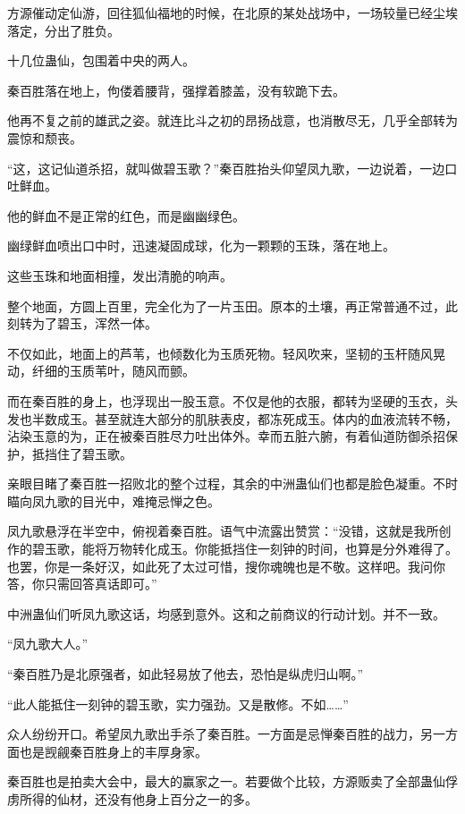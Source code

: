 
\begin{this_body}

方源催动定仙游，回往狐仙福地的时候，在北原的某处战场中，一场较量已经尘埃落定，分出了胜负。

十几位蛊仙，包围着中央的两人。

秦百胜落在地上，佝偻着腰背，强撑着膝盖，没有软跪下去。

他再不复之前的雄武之姿。就连比斗之初的昂扬战意，也消散尽无，几乎全部转为震惊和颓丧。

“这，这记仙道杀招，就叫做碧玉歌？”秦百胜抬头仰望凤九歌，一边说着，一边口吐鲜血。

他的鲜血不是正常的红色，而是幽幽绿色。

幽绿鲜血喷出口中时，迅速凝固成球，化为一颗颗的玉珠，落在地上。

这些玉珠和地面相撞，发出清脆的响声。

整个地面，方圆上百里，完全化为了一片玉田。原本的土壤，再正常普通不过，此刻转为了碧玉，浑然一体。

不仅如此，地面上的芦苇，也倾数化为玉质死物。轻风吹来，坚韧的玉杆随风晃动，纤细的玉质苇叶，随风而颤。

而在秦百胜的身上，也浮现出一股玉意。不仅是他的衣服，都转为坚硬的玉衣，头发也半数成玉。甚至就连大部分的肌肤表皮，都冻死成玉。体内的血液流转不畅，沾染玉意的为，正在被秦百胜尽力吐出体外。幸而五脏六腑，有着仙道防御杀招保护，抵挡住了碧玉歌。

亲眼目睹了秦百胜一招败北的整个过程，其余的中洲蛊仙们也都是脸色凝重。不时瞄向凤九歌的目光中，难掩忌惮之色。

凤九歌悬浮在半空中，俯视着秦百胜。语气中流露出赞赏：“没错，这就是我所创作的碧玉歌，能将万物转化成玉。你能抵挡住一刻钟的时间，也算是分外难得了。也罢，你是一条好汉，如此死了太过可惜，搜你魂魄也是不敬。这样吧。我问你答，你只需回答真话即可。”

中洲蛊仙们听凤九歌这话，均感到意外。这和之前商议的行动计划。并不一致。

“凤九歌大人。”

“秦百胜乃是北原强者，如此轻易放了他去，恐怕是纵虎归山啊。”

“此人能抵住一刻钟的碧玉歌，实力强劲。又是散修。不如……”

众人纷纷开口。希望凤九歌出手杀了秦百胜。一方面是忌惮秦百胜的战力，另一方面也是觊觎秦百胜身上的丰厚身家。

秦百胜也是拍卖大会中，最大的赢家之一。若要做个比较，方源贩卖了全部蛊仙俘虏所得的仙材，还没有他身上百分之一的多。


\end{this_body}
